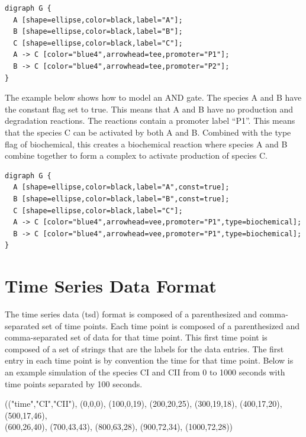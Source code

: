 \documentclass[titlepage,11pt]{article}
\begin{document}
\begin{verbatim}
digraph G {
  A [shape=ellipse,color=black,label="A"];
  B [shape=ellipse,color=black,label="B"];
  C [shape=ellipse,color=black,label="C"];
  A -> C [color="blue4",arrowhead=tee,promoter="P1"];
  B -> C [color="blue4",arrowhead=tee,promoter="P2"];
}
\end{verbatim}

The example below shows how to model an AND gate. The species
A and B have the constant flag set to true. This means that A and
B have no production and degradation reactions. The reactions
contain a promoter label ``P1''. This means that the
species C can be activated by both A and B. Combined with the
type flag of biochemical, this creates a biochemical reaction
where species A and B combine together to form a complex to
activate production of species C. 

\begin{verbatim}
digraph G {
  A [shape=ellipse,color=black,label="A",const=true];
  B [shape=ellipse,color=black,label="B",const=true];
  C [shape=ellipse,color=black,label="C"];
  A -> C [color="blue4",arrowhead=vee,promoter="P1",type=biochemical];
  B -> C [color="blue4",arrowhead=vee,promoter="P1",type=biochemical];
}
\end{verbatim}

\section{\label{TSD}Time Series Data Format}

\noindent
The time series data (tsd) format is composed of a
parenthesized and comma-separated set of time points. Each time
point is composed of a parenthesized and comma-separated set of
data for that time point. This first time point is composed of a
set of strings that are the labels for the data entries. The
first entry in each time point is by convention the time for that
time point. Below is an example simulation of the species CI and
CII from 0 to 1000 seconds with time points separated by 100
seconds. 

(("time","CI","CII"), (0,0,0), (100,0,19), (200,20,25), (300,19,18),
(400,17,20), (500,17,46), \\
(600,26,40), (700,43,43), (800,63,28), (900,72,34), (1000,72,28))

\end{document}
